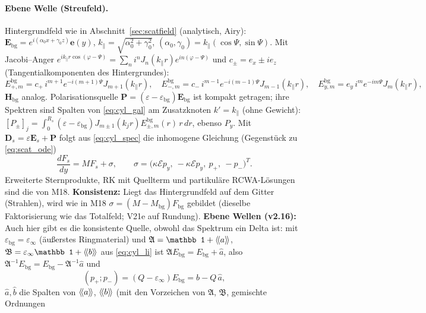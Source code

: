 \paragraph{Ebene Welle (Streufeld).} Hintergrundfeld wie in Abschnitt~\ref{sec:scatfield} (analytisch, Airy):
$\mathbf E_{\text{bg}}=e^{i(\alpha_0x+\gamma_0z)}\mathbf e(y)$, $k_\parallel=\sqrt{\alpha_0^2+\gamma_0^2}$, $(\alpha_0,\gamma_0)=k_\parallel(\cos\Psi,\sin\Psi)$.
Mit Jacobi--Anger $e^{ik_\parallel r\cos(\varphi-\Psi)}=\sum_ni^nJ_n(k_\parallel r)e^{in(\varphi-\Psi)}$ und
$c_\pm=e_x\pm ie_z$ (Tangentialkomponenten des Hintergrundes):
\begin{equation}
  E^{\text{bg}}_{+,m}=c_+\,i^{m+1}e^{-i(m+1)\Psi}J_{m+1}(k_\parallel r),\quad
  E^{\text{bg}}_{-,m}=c_-\,i^{m-1}e^{-i(m-1)\Psi}J_{m-1}(k_\parallel r),\quad
  E^{\text{bg}}_{y,m}=e_y\,i^me^{-im\Psi}J_m(k_\parallel r),
  \label{eq:cyl_jacobi}
\end{equation}
$\mathbf H_{\text{bg}}$ analog. Polarisationsquelle $\mathbf P=(\varepsilon-\varepsilon_{\text{bg}})\mathbf E_{\text{bg}}$ ist kompakt
getragen; ihre Spektren sind Spalten von \eqref{eq:cyl_gal} am Zusatzknoten $k'=k_\parallel$ (ohne Gewicht):
$[P_\pm]_j=\int_0^{R_s}(\varepsilon-\varepsilon_{\text{bg}})J_{m\pm1}(k_jr)E^{\text{bg}}_{\pm,m}(r)\,r\,dr$, ebenso $P_y$. Mit
$\mathbf D_s=\varepsilon\mathbf E_s+\mathbf P$ folgt aus \eqref{eq:cyl_spec} die inhomogene Gleichung (Gegenstück zu \eqref{eq:scat_ode})
\begin{equation}
  \frac{dF_s}{dy}=MF_s+\sigma,\qquad \sigma=\big(\kappa\mathcal Ep_y,\ -\kappa\mathcal Ep_y,\ p_+,\ -p_-\big)^T .
  \label{eq:cyl_scat}
\end{equation}
Erweiterte Sternprodukte, RK mit Quellterm und partikuläre RCWA-Lösungen sind die von M18.
\textbf{Konsistenz:} Liegt das Hintergrundfeld auf dem Gitter (Strahlen), wird wie in M18 $\sigma=(M-M_{\text{bg}})F_{\text{bg}}$
gebildet (dieselbe Faktorisierung wie das Totalfeld; V21e auf Rundung). \textbf{Ebene Wellen (v2.16):} Auch hier gibt es
die konsistente Quelle, obwohl das Spektrum ein Delta ist: mit $\varepsilon_{\text{bg}}=\varepsilon_\infty$ (äußerstes
Ringmaterial) und $\mathfrak A=\mathbb 1+\hk{a}$, $\mathfrak B=\varepsilon_\infty\mathbb 1+\hk{b}$ aus \eqref{eq:cyl_li}
ist $\mathfrak A E_{\text{bg}}=E_{\text{bg}}+\hat a$, also $\mathfrak A^{-1}E_{\text{bg}}=E_{\text{bg}}-\mathfrak A^{-1}\hat a$ und
\[
  (p_+;p_-)=(Q-\varepsilon_\infty)E_{\text{bg}}=\hat b-Q\,\hat a ,
\]
$\hat a,\hat b$ die Spalten von $\langle\!\langle a\rangle\!\rangle$, $\langle\!\langle b\rangle\!\rangle$ (mit den Vorzeichen von $\mathfrak A$, $\mathfrak B$, gemischte Ordnungen
